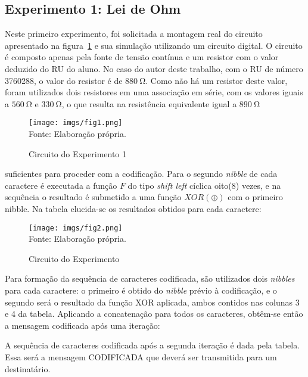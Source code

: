 \documentclass[a4paper,pra,aps,twocolumn,superscriptaddress,10pt,final]{revtex4-2}
\begin{document}
    \subsection{Experimento 1: Lei de Ohm}
    \label{subsec:exp1}

    Neste primeiro experimento, foi solicitada a montagem real do circuito apresentado na figura~\ref{fig:circuito1} e sua simulação utilizando um circuito digital. O circuito é composto apenas pela fonte de tensão contínua e um resistor com o valor deduzido do RU do aluno. No caso do autor deste trabalho, com o RU de número 3760288, o valor do resistor é de $\qty{880}{\ohm}$. Como não há um resistor deste valor, foram utilizados dois resistores em uma associação em série, com os valores iguais a $\qty{560}{\ohm}$ e $\qty{330}{\ohm}$, o que resulta na resistência equivalente igual a $\qty{890}{\ohm}$

    \begin{figure}[htpb]
        \centering
        \label{fig:circuito1}
        \caption{Circuito do Experimento 1}
        \texttt{[image: imgs/fig1.png]}\\
        \scriptsize{Fonte: Elaboração própria.}
    \end{figure}
   
    suficientes para proceder com a codificação. Para o segundo \textit{nibble} de cada caractere é executada a função $F$ do tipo \textit{shift left} cíclica oito($8$) vezes, e na sequência o resultado é submetido a uma função $XOR (\oplus)$ com o primeiro nibble. Na tabela elucida-se os resultados obtidos para cada caractere:

    \begin{figure}[htpb]
        \centering
        \label{fig:circuito2}
        \caption{Circuito do Experimento}
        \texttt{[image: imgs/fig2.png]}\\
        \scriptsize{Fonte: Elaboração própria.}
    \end{figure}

    Para formação da sequência de caracteres codificada, são utilizados dois \textit{nibbles} para cada caractere: o primeiro é obtido do \textit{nibble} prévio à codificação, e o segundo será o resultado da função XOR aplicada, ambos contidos nas colunas 3 e 4 da tabela. Aplicando a concatenação para todos os caracteres, obtêm-se então a mensagem codificada após uma iteração:

    A sequência de caracteres codificada após a segunda iteração é dada pela tabela. Essa será a mensagem CODIFICADA que deverá ser transmitida para um destinatário.
\end{document}
